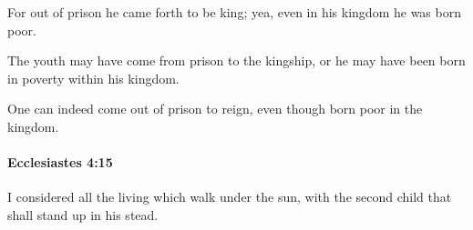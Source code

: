 			\begin{versebox}
					\item[BHS] 
					\item[LXX] 
					\item[ASV] For out of prison he came forth to be king; yea, even in his kingdom he was born poor.
					\item[NIV] The youth may have come from prison to the kingship, or he may have been born in poverty within his kingdom.
					\item[NRSV] One can indeed come out of prison to reign, even though born poor in the kingdom.
			\end{versebox}

		\paragraph{Ecclesiastes 4:15} %
			\label{ECCLESIASTES-4-15}

			I considered all the living which walk under the sun, with the second child that shall stand up in his stead.

